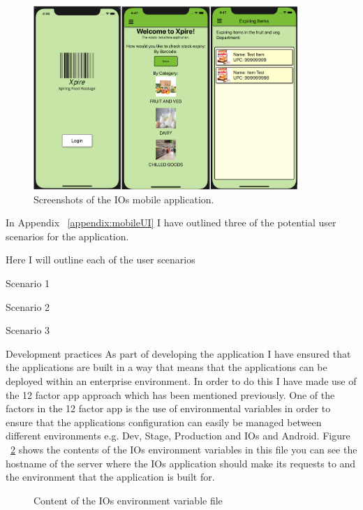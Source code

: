 \documentclass[a4paper,11pt]{report}
\begin{document}
\begin{figure}[H]
    \centering
    \includegraphics[width=10cm]{./assets/images/appUI.png}
    \caption{Screenshots of the IOs mobile application.}
    \label{fig:IOSScreenshots}
\end{figure}

In Appendix ~\ref{appendix:mobileUI} I have outlined three of the potential user scenarios for the application.

Here I will outline each of the user scenarios

Scenario 1


Scenario 2


Scenario 3

Development practices
As part of developing the application I have ensured that the applications are built in a way that means that the applications can be deployed within an enterprise environment. In order to do this I have made use of the 12 factor app approach which has been mentioned previously. One of the factors in the 12 factor app is the use of environmental variables in order to ensure that the applications configuration can easily be managed between different environments e.g. Dev, Stage, Production and IOs and Android. 
Figure ~\ref{fig:iosVars} shows the contents of the IOs environment variables in this file you can see the hostname of the server where the IOs application should make its requests to and the environment that the application is built for.

\begin{figure}[H]
    \centering
    \caption{Content of the IOs environment variable file}
    \label{fig:iosVars}
\end{figure}
\end{document}
